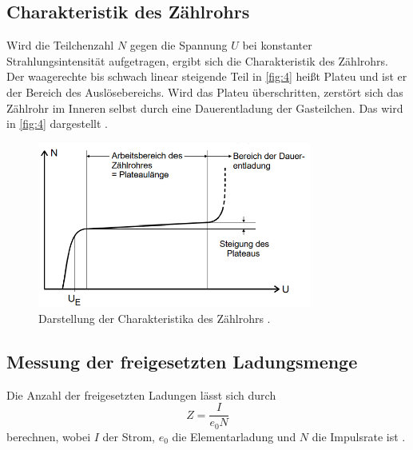 \subsection{Charakteristik des Zählrohrs}
Wird die Teilchenzahl $N$ gegen die Spannung $U$ bei konstanter Strahlungsintensität aufgetragen, ergibt sich die Charakteristik des Zählrohrs. Der waagerechte bis schwach linear steigende Teil in \autoref{fig:4} heißt Plateu und ist er der Bereich des Auslösebereichs. Wird das Plateu überschritten, zerstört sich das Zählrohr im Inneren selbst durch eine Dauerentladung der Gasteilchen.  Das wird in \autoref{fig:4} dargestellt \cite{sample}.
\begin{figure}[H] 
  \centering 
  \includegraphics[width=9cm]{content/4} 
  \caption{Darstellung der Charakteristika des Zählrohrs \cite{sample}.} 
  \label{fig:4} 
\end{figure}

\subsection{Messung der freigesetzten Ladungsmenge}
Die Anzahl der freigesetzten Ladungen lässt sich durch 
\begin{equation}
  Z=\frac{I}{e_0 N}
  \label{eq:5}
\end{equation}
berechnen, wobei $I$ der Strom, $e_0$ die Elementarladung und $N$ die Impulsrate ist \cite{sample}. 
